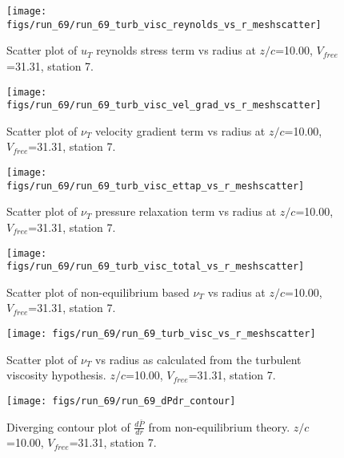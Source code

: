 \begin{figure}[H]
\centering
\texttt{[image: figs/run\_69/run\_69\_turb\_visc\_reynolds\_vs\_r\_meshscatter]}
\caption{Scatter plot of $
u_T$ reynolds stress term vs radius at $z/c$=10.00, $V_{free}$=31.31, station 7.}
\end{figure}


\begin{figure}[H]
\centering
\texttt{[image: figs/run\_69/run\_69\_turb\_visc\_vel\_grad\_vs\_r\_meshscatter]}
\caption{Scatter plot of $\nu_T$ velocity gradient term vs radius at $z/c$=10.00, $V_{free}$=31.31, station 7.}
\end{figure}


\begin{figure}[H]
\centering
\texttt{[image: figs/run\_69/run\_69\_turb\_visc\_ettap\_vs\_r\_meshscatter]}
\caption{Scatter plot of $\nu_T$ pressure relaxation term vs radius at $z/c$=10.00, $V_{free}$=31.31, station 7.}
\end{figure}


\begin{figure}[H]
\centering
\texttt{[image: figs/run\_69/run\_69\_turb\_visc\_total\_vs\_r\_meshscatter]}
\caption{Scatter plot of non-equilibrium based $\nu_T$ vs radius at $z/c$=10.00, $V_{free}$=31.31, station 7.}
\end{figure}


\begin{figure}[H]
\centering
\texttt{[image: figs/run\_69/run\_69\_turb\_visc\_vs\_r\_meshscatter]}
\caption{Scatter plot of $\nu_T$ vs radius as calculated from the turbulent viscosity hypothesis. $z/c$=10.00, $V_{free}$=31.31, station 7.}
\end{figure}


\begin{figure}[H]
\centering
\texttt{[image: figs/run\_69/run\_69\_dPdr\_contour]}
\caption{Diverging contour plot of $\frac{d\bar{P}}{dr}$ from non-equilibrium theory. $z/c$=10.00, $V_{free}$=31.31, station 7.}
\end{figure}


